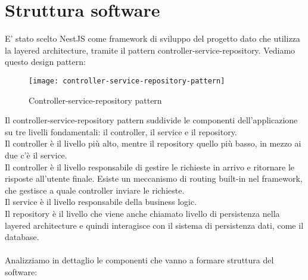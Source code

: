 \section{Struttura software}
E' stato scelto NestJS come framework di sviluppo del progetto dato che utilizza la layered architecture,
tramite il pattern controller-service-repository. Vediamo questo design pattern:
\begin{figure}[H]
    \centering
    \texttt{[image: controller-service-repository-pattern]}
    \caption{Controller-service-repository pattern}
\end{figure}
\leavevmode\newline
Il controller-service-repository pattern suddivide le componenti dell'applicazione su tre livelli fondamentali:
il controller, il service e il repository.
\\
Il controller è il livello più alto, mentre il repository quello più basso, in mezzo ai due c'è il service.
\\
Il controller è il livello responsabile di gestire le richieste in arrivo e ritornare le risposte all'utente finale.
Esiste un meccanismo di routing built-in nel framework, che gestisce a quale controller inviare le richieste.
\\
Il service è il livello responsabile della business logic.
\\
Il repository è il livello che viene anche chiamato livello di persistenza nella layered architecture e quindi interagisce
con il sistema di persistenza dati, come il database.
\\\\
Analizziamo in dettaglio le componenti che vanno a formare struttura del software:

